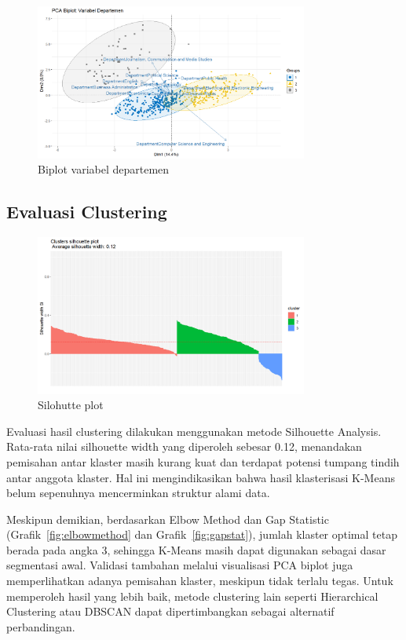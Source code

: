 \begin{figure}[!htpb]
    \centering
    \includegraphics[width=0.8\textwidth]{figures/departmentplot.png}
    \caption{Biplot variabel departemen}
    \label{fig:biplot-department}
\end{figure}

\pagebreak
\subsection{Evaluasi Clustering}
\begin{figure}[!htpb]
    \centering
    \includegraphics[width=0.8\textwidth]{figures/silhouetteplot.png}
    \caption{Silohutte plot}
    \label{fig:silhouetteplot}
\end{figure}
Evaluasi hasil clustering dilakukan menggunakan metode Silhouette Analysis. Rata-rata nilai silhouette width yang diperoleh sebesar 0.12, menandakan pemisahan antar klaster masih kurang kuat dan terdapat potensi tumpang tindih antar anggota klaster. Hal ini mengindikasikan bahwa hasil klasterisasi K-Means belum sepenuhnya mencerminkan struktur alami data.

Meskipun demikian, berdasarkan Elbow Method dan Gap Statistic (Grafik~\ref{fig:elbowmethod} dan Grafik~\ref{fig:gapstat}), jumlah klaster optimal tetap berada pada angka 3, sehingga K-Means masih dapat digunakan sebagai dasar segmentasi awal. Validasi tambahan melalui visualisasi PCA biplot juga memperlihatkan adanya pemisahan klaster, meskipun tidak terlalu tegas. Untuk memperoleh hasil yang lebih baik, metode clustering lain seperti Hierarchical Clustering atau DBSCAN dapat dipertimbangkan sebagai alternatif perbandingan.
